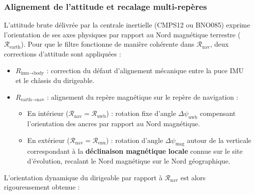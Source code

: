 \documentclass[../Formulations_Kalman.tex]{subfiles}
\begin{document}
\subsubsection{Alignement de l'attitude et recalage multi-repères}
L'attitude brute délivrée par la centrale inertielle (CMPS12 ou BNO085) exprime l'orientation de ses axes physiques par rapport au Nord magnétique terrestre ($\mathcal{R}_{\text{earth}}$). Pour que le filtre fonctionne de manière cohérente dans $\mathcal{R}_{\text{nav}}$, deux corrections d'attitude sont appliquées :
\begin{itemize}
    \item $R_{\text{imu} \to \text{body}}$ : correction du défaut d'alignement mécanique entre la puce IMU et le châssis du dirigeable.
    \item $R_{\text{earth} \to \text{nav}}$ : alignement du repère magnétique sur le repère de navigation :
    \begin{itemize}
        \item En intérieur ($\mathcal{R}_{\text{nav}} = \mathcal{R}_{\text{uwb}}$) : rotation fixe d'angle $\Delta\psi_{\text{uwb}}$ compensant l'orientation des ancres par rapport au Nord magnétique.
        \item En extérieur ($\mathcal{R}_{\text{nav}} = \mathcal{R}_{\text{enu}}$) : rotation d'angle $\Delta\psi_{\text{mag}}$ autour de la verticale correspondant à la \textbf{déclinaison magnétique locale} connue sur le site d'évolution, recalant le Nord magnétique sur le Nord géographique.
    \end{itemize}
\end{itemize}
L'orientation dynamique du dirigeable par rapport à $\mathcal{R}_{\text{nav}}$ est alors rigoureusement obtenue :
\end{document}

